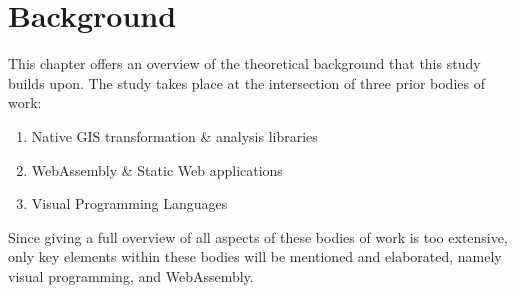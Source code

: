 
\chapter{Background}
\label{chap:background}


This chapter offers an overview of the theoretical background that this study builds upon.
The study takes place at the intersection of three prior bodies of work:
\begin{enumerate}[-]
  \item Native GIS transformation \& analysis libraries
  \item WebAssembly \& Static Web applications
  \item Visual Programming Languages
\end{enumerate}

Since giving a full overview of all aspects of these bodies of work is too extensive, only key elements within these bodies will be mentioned and elaborated, namely visual programming, and WebAssembly.  






